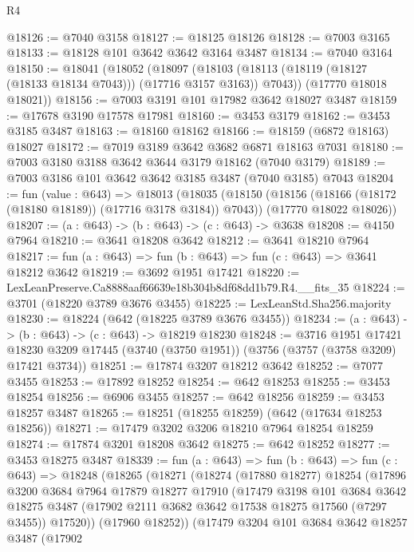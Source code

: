 \begin{lexlean}{R4}
\begin{coremodule}
@18126 := @7040 @3158
@18127 := @18125 @18126
@18128 := @7003 @3165
@18133 := @18128 @101 @3642 @3642 @3164 @3487
@18134 := @7040 @3164
@18150 := @18041
    (@18052
      (@18097 (@18103 (@18113 (@18119 (@18127 (@18133 @18134 @7043))) (@17716 @3157 @3163)) @7043))
      (@17770 @18018 @18021))
@18156 := @7003 @3191 @101 @17982 @3642 @18027 @3487
@18159 := @17678 @3190 @17578 @17981
@18160 := @3453 @3179
@18162 := @3453 @3185 @3487
@18163 := @18160 @18162
@18166 := @18159 (@6872 @18163) @18027
@18172 := @7019 @3189 @3642 @3682 @6871 @18163 @7031
@18180 := @7003 @3180 @3188 @3642 @3644 @3179 @18162 (@7040 @3179)
@18189 := @7003 @3186 @101 @3642 @3642 @3185 @3487 (@7040 @3185) @7043
@18204 := fun (value : @643) =>
  @18013
    (@18035
      (@18150 (@18156 (@18166 (@18172 (@18180 @18189)) (@17716 @3178 @3184)) @7043))
      (@17770 @18022 @18026))
@18207 := (a : @643) -> (b : @643) -> (c : @643) -> @3638
@18208 := @4150 @7964
@18210 := @3641 @18208 @3642
@18212 := @3641 @18210 @7964
@18217 := fun (a : @643) => fun (b : @643) => fun (c : @643) => @3641 @18212 @3642
@18219 := @3692 @1951 @17421
@18220 := LexLeanPreserve.Ca8888aaf66639e18b304b8df68dd1b79.R4.__fits_35
@18224 := @3701 (@18220 @3789 @3676 @3455)
@18225 := LexLeanStd.Sha256.majority
@18230 := @18224 (@642 (@18225 @3789 @3676 @3455))
@18234 := (a : @643) -> (b : @643) -> (c : @643) -> @18219 @18230
@18248 := @3716
    @1951
    @17421
    @18230
    @3209
    @17445
    (@3740 (@3750 @1951))
    (@3756 (@3757 (@3758 @3209) @17421 @3734))
@18251 := @17874 @3207 @18212 @3642
@18252 := @7077 @3455
@18253 := @17892 @18252
@18254 := @642 @18253
@18255 := @3453 @18254
@18256 := @6906 @3455
@18257 := @642 @18256
@18259 := @3453 @18257 @3487
@18265 := @18251 (@18255 @18259) (@642 (@17634 @18253 @18256))
@18271 := @17479 @3202 @3206 @18210 @7964 @18254 @18259
@18274 := @17874 @3201 @18208 @3642
@18275 := @642 @18252
@18277 := @3453 @18275 @3487
@18339 := fun (a : @643) =>
  fun (b : @643) =>
  fun (c : @643) =>
  @18248
    (@18265
      (@18271
        (@18274
          (@17880 @18277)
          @18254
          (@17896
            @3200
            @3684
            @7964
            @17879
            @18277
            @17910
            (@17479
              @3198
              @101
              @3684
              @3642
              @18275
              @3487
              (@17902 @2111 @3682 @3642 @17538 @18275 @17560 (@7297 @3455))
              @17520))
          (@17960 @18252))
        (@17479
          @3204
          @101
          @3684
          @3642
          @18257
          @3487
          (@17902

\end{coremodule}
\end{lexlean}
